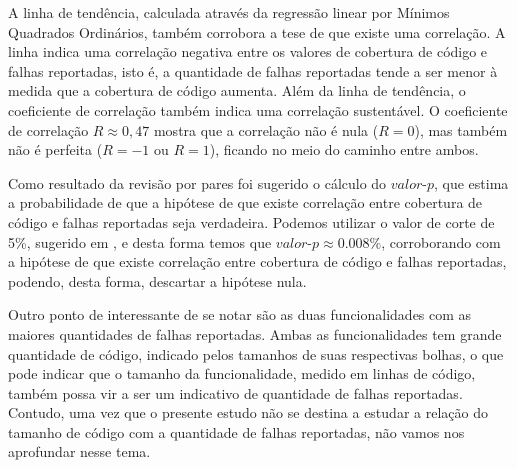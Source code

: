 \documentclass[11.5pt]{article}
\begin{document}
A linha de tendência, calculada através da regressão linear por Mínimos Quadrados Ordinários,
também corrobora a tese de que existe uma correlação.
A linha indica uma correlação negativa entre os valores de cobertura de código e falhas reportadas,
isto é, a quantidade de falhas reportadas tende a ser menor à medida que a cobertura de código
aumenta.
Além da linha de tendência, o coeficiente de correlação também indica uma correlação sustentável.
O coeficiente de correlação $R \approx 0,47$ mostra que a correlação não é nula ($R = 0$), mas
também não é perfeita ($R = -1$ ou $R = 1$), ficando no meio do caminho entre ambos.

Como resultado da revisão por pares foi sugerido o cálculo do $valor\mbox{-}p$, que estima a
probabilidade de que a hipótese de que existe correlação entre cobertura de código e falhas
reportadas seja verdadeira.
Podemos utilizar o valor de corte de 5\%, sugerido em \cite{openIntroStat}, e desta forma temos
que $valor\mbox{-}p \approx 0.008\%$, corroborando com a hipótese de que existe correlação entre cobertura
de código e falhas reportadas, podendo, desta forma, descartar a hipótese nula.

Outro ponto de interessante de se notar são as duas funcionalidades com as maiores quantidades de
falhas reportadas.
Ambas as funcionalidades tem grande quantidade de código, indicado pelos tamanhos de suas
respectivas bolhas, o que pode indicar que o tamanho da funcionalidade, medido em linhas de código,
também possa vir a ser um indicativo de quantidade de falhas reportadas.
Contudo, uma vez que o presente estudo não se destina a estudar a relação do tamanho de código com
a quantidade de falhas reportadas, não vamos nos aprofundar nesse tema.
\end{document}
